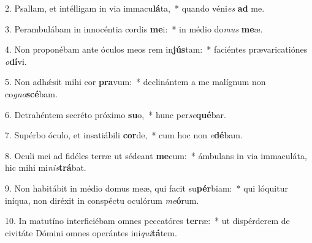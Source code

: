 2. Psallam, et intélligam in via immacu\textbf{lá}ta,~*  quando véni\textit{es} \textbf{ad} me.\

3. Perambulábam in innocéntia cordis \textbf{me}i:~*  in médio do\textit{mus} \textbf{me}æ.\

4. Non proponébam ante óculos meos rem in\textbf{jús}tam:~*  faciéntes prævaricatiónes \textit{o}\textbf{dí}vi.\

5. Non adhǽsit mihi cor \textbf{pra}vum:~*  declinántem a me malígnum non co\textit{gno}\textbf{scé}bam.\

6. Detrahéntem secréto próximo \textbf{su}o,~*  hunc per\textit{se}\textbf{qué}bar.\

7. Supérbo óculo, et insatiábili \textbf{cor}de,~*  cum hoc non \textit{e}\textbf{dé}bam.\

8. Oculi mei ad fidéles terræ ut sédeant \textbf{me}cum:~*  ámbulans in via immaculáta, hic mihi mi\textit{nis}\textbf{trá}bat.\

9. Non habitábit in médio domus meæ, qui facit su\textbf{pér}biam:~*  qui lóquitur iníqua, non diréxit in conspéctu oculórum \textit{me}\textbf{ó}rum.\

10. In matutíno interficiébam omnes peccatóres \textbf{ter}ræ:~*  ut dispérderem de civitáte Dómini omnes operántes ini\textit{qui}\textbf{tá}tem.\

